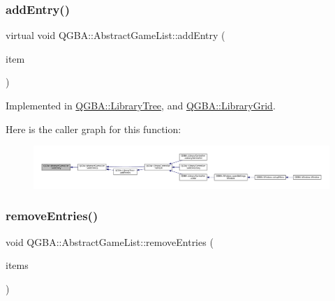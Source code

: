 \subsubsection{\texorpdfstring{add\+Entry()}{addEntry()}}
{\footnotesize\ttfamily virtual void Q\+G\+B\+A\+::\+Abstract\+Game\+List\+::add\+Entry (\begin{DoxyParamCaption}\item[{\mbox{\hyperlink{namespace_q_g_b_a_a201fa9f2cb8f778666a134ba81909358}{Library\+Entry\+Ref}}}]{item }\end{DoxyParamCaption})\hspace{0.3cm}{\ttfamily [pure virtual]}}



Implemented in \mbox{\hyperlink{class_q_g_b_a_1_1_library_tree_a36da639f0d8de0811da90f337ee403bd}{Q\+G\+B\+A\+::\+Library\+Tree}}, and \mbox{\hyperlink{class_q_g_b_a_1_1_library_grid_a7499ff69eaf0427c1fd5b09eb7812909}{Q\+G\+B\+A\+::\+Library\+Grid}}.

Here is the caller graph for this function\+:
\nopagebreak
\begin{figure}[H]
\begin{center}
\leavevmode
\includegraphics[width=350pt]{class_q_g_b_a_1_1_abstract_game_list_a4eb177df105d205ebc19a017343874ce_icgraph}
\end{center}
\end{figure}
\mbox{\label{class_q_g_b_a_1_1_abstract_game_list_a2dcb6a520d4ab5a4f0e62233f2a296d9}} 
\subsubsection{\texorpdfstring{remove\+Entries()}{removeEntries()}}
{\footnotesize\ttfamily void Q\+G\+B\+A\+::\+Abstract\+Game\+List\+::remove\+Entries (\begin{DoxyParamCaption}\item[{Q\+List$<$ \mbox{\hyperlink{namespace_q_g_b_a_a201fa9f2cb8f778666a134ba81909358}{Library\+Entry\+Ref}} $>$}]{items }\end{DoxyParamCaption})\hspace{0.3cm}{\ttfamily [virtual]}}

